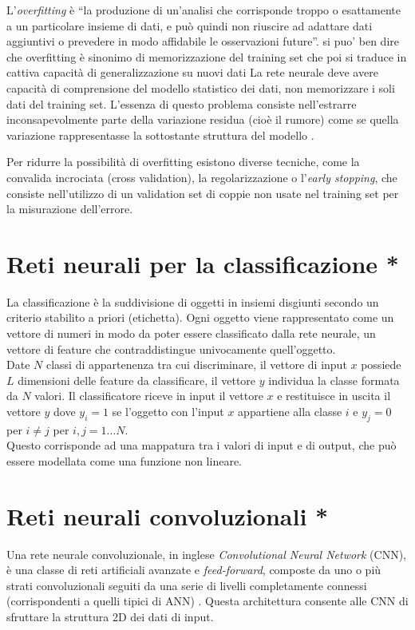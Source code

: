 L'\emph{overfitting} è ``la produzione di un'analisi che corrisponde troppo o esattamente a un particolare insieme di dati, e può quindi non riuscire ad adattare dati aggiuntivi o prevedere in modo affidabile le osservazioni future''.
{\color{red} si puo' ben dire che overfitting è sinonimo di memorizzazione del training set che poi si traduce in cattiva capacità di generalizzazione su nuovi dati}
La rete neurale deve avere capacità di comprensione del modello statistico dei dati, non memorizzare i soli dati del training set. L'essenza di questo problema consiste nell'estrarre inconsapevolmente parte della variazione residua (cioè il rumore) come se quella variazione rappresentasse la sottostante struttura del modello \cite{burnham2003model}.

Per ridurre la possibilità di overfitting esistono diverse tecniche, come la convalida incrociata (cross validation), la regolarizzazione o l'\emph{early stopping}, che consiste nell'utilizzo di un validation set di coppie non usate nel training set per la misurazione dell'errore.

\section{Reti neurali per la classificazione *}
\label{sec:classificazione}
La classificazione è la suddivisione di oggetti in insiemi disgiunti secondo un criterio stabilito a priori (etichetta). Ogni oggetto viene rappresentato come un vettore di numeri in modo da poter essere classificato dalla rete neurale, un vettore di feature che contraddistingue univocamente quell'oggetto.\\

Date $N$ classi di appartenenza tra cui discriminare, il vettore di input $x$ possiede $L$ dimensioni delle feature da classificare, il vettore $y$ individua la classe formata da $N$ valori. Il classificatore riceve in input il vettore $x$ e restituisce in uscita il vettore $y$ dove $y_i=1$ se l'oggetto con l'input $x$ appartiene alla classe $i$ e $y_j=0$ per $i\neq j$ per $i,j=1 \dots N$.\\
Questo corrisponde ad una mappatura tra i valori di input e di output, che può essere modellata come una funzione non lineare.

\section{Reti neurali convoluzionali *}
\label{sec:cnn}
Una rete neurale convoluzionale, in inglese \emph{Convolutional Neural Network} (CNN), è una classe di reti artificiali avanzate e \emph{feed-forward}, composte da uno o più strati convoluzionali seguiti da una serie di livelli completamente connessi (corrispondenti a quelli tipici di ANN) \cite{kim2014convolutional}. Questa architettura consente alle CNN di sfruttare la struttura 2D dei dati di input.\\

